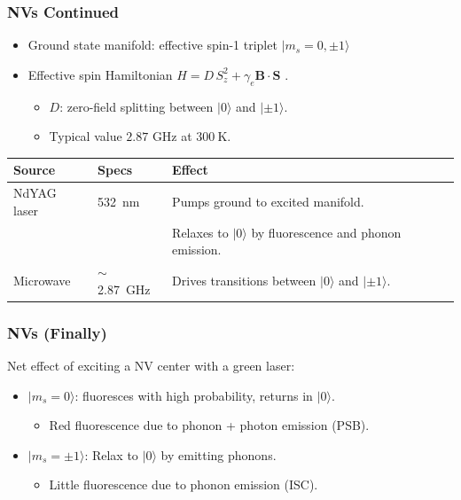 \begin{frame}
    \frametitle{NVs Continued} 
    \begin{itemize}
        \item Ground state manifold: effective spin-1 triplet $|m_s=0, \pm 1\rangle$
        \item Effective spin Hamiltonian $H = D\, S_z^2 + \gamma_e {\mathbf{B}} \cdot {\mathbf{S}}$ \cite{Prasad2018NVNotes}. 
        \begin{itemize}
            \item $D$: zero-field splitting between $|0\rangle$ and $|\pm 1\rangle$. 
            \item Typical value $2.87$ GHz at $\SI{300}{\kelvin}$. 
        \end{itemize}
    \end{itemize}
    \begin{table}
        \centering
        {\small %
        \begin{tabular}{ll>{\scriptsize}l} %
            \toprule
            Source & Specs & Effect \\
            \midrule
            NdYAG laser & \SI{532}{\nano\meter} & 
            Pumps ground to excited manifold. \\ 
             & & Relaxes to $|0\rangle$ by fluorescence and phonon emission. \\
            Microwave & $\sim$\SI{2.87}{\giga\hertz} & Drives transitions between $|0\rangle$ and $|\pm 1\rangle$. \\
            \bottomrule
        \end{tabular}
        } %
        \label{tab:radiation_effects}
    \end{table}
\end{frame}

\begin{frame}
    \frametitle{NVs (Finally)} 
    Net effect of exciting a NV center with a green laser: 
    \begin{itemize}
        \item $|m_s=0\rangle$: fluoresces with high probability, returns in $|0\rangle$. 
        \begin{itemize}
            \item Red fluorescence due to phonon + photon emission (PSB). 
        \end{itemize}
        \item $|m_s=\pm 1\rangle$: Relax to $|0\rangle$ by emitting phonons. 
        \begin{itemize}
            \item Little fluorescence due to phonon emission (ISC). 
        \end{itemize}
    \end{itemize}
    
\end{frame}

